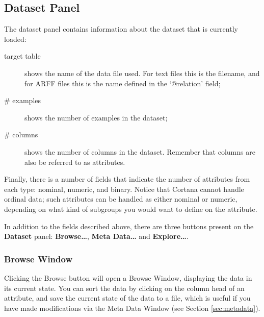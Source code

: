 \documentclass{article}
\begin{document}
\subsection{Dataset Panel}
\label{sec:dataset}


The dataset panel contains information about the dataset that is currently
loaded:
\begin{description}
\item[target table] shows the name of the data file used. For text
files this is the filename, and for ARFF files this is the name defined in the
`@relation' field;
\item[\# examples] shows the number of examples in the dataset;
\item[\# columns] shows the number of columns in the dataset.
Remember that columns are also be referred to as attributes.
\end{description}
Finally, there is a number of fields that indicate the number of attributes
from each \gls{type}: \gls{nominal}, \gls{numeric}, and \gls{binary}. Notice
that Cortana cannot handle \gls{ordinal} data; such attributes can be
handled as either \gls{nominal} or \gls{numeric}, depending on what kind of
subgroups you would want to define on the attribute.

In addition to the fields described above, there are three buttons present
on the {\bf Dataset} panel: {\bf Browse\ldots}, {\bf Meta Data\ldots} and
{\bf Explore\ldots}.

\subsubsection{Browse Window}

Clicking the Browse button will open a Browse Window, displaying the
data in its current state.  You can sort the data by clicking on the column
head of an attribute, and save the current state of the data to a file,
which is useful if you have made modifications via the Meta Data Window (see
Section \ref{sec:metadata}).

\end{document}
